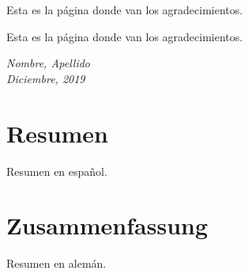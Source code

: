 \documentclass{upa-tesis}
\begin{document}
Esta es la página donde van los agradecimientos.

Esta es la página donde van los agradecimientos.


\textit{Nombre, Apellido}\\
\textit{Diciembre, 2019}


\newpage
{}
\section*{\Huge{Resumen}}

Resumen en español.



	\newpage
{}
\section*{\Huge{Zusammenfassung}}

Resumen en alemán.




\newpage 
{}
{}
\tableofcontents


\newpage 
{}
\listoffigures
\end{document}
